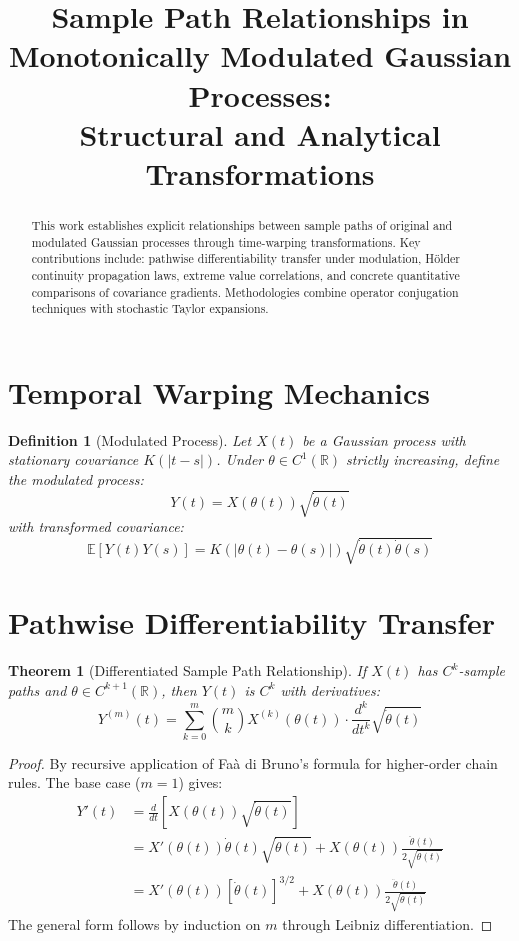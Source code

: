 \documentclass{article}
\title{Sample Path Relationships in Monotonically Modulated Gaussian Processes: \\ Structural and Analytical Transformations}
\author{}
\date{}
\newtheorem{theorem}{Theorem}
\newtheorem{definition}{Definition}
\begin{document}
\maketitle

\begin{abstract}
This work establishes explicit relationships between sample paths of original and modulated Gaussian processes through time-warping transformations. Key contributions include: pathwise differentiability transfer under modulation, Hölder continuity propagation laws, extreme value correlations, and concrete quantitative comparisons of covariance gradients. Methodologies combine operator conjugation techniques with stochastic Taylor expansions.
\end{abstract}

\section{Temporal Warping Mechanics} 

\begin{definition}[Modulated Process]
Let $X(t)$ be a Gaussian process with stationary covariance $K(|t-s|)$. Under $\theta \in C^1(\mathbb{R})$ strictly increasing, define the modulated process:
\begin{equation*}
Y(t) = X(\theta(t))\sqrt{\dot{\theta}(t)}
\end{equation*}
with transformed covariance:
\begin{equation*}
\mathbb{E}[Y(t)Y(s)] = K(|\theta(t)-\theta(s)|)\sqrt{\dot{\theta}(t)\dot{\theta}(s)}
\end{equation*}
\end{definition}

\section{Pathwise Differentiability Transfer}

\begin{theorem}[Differentiated Sample Path Relationship]
If $X(t)$ has $C^k$-sample paths and $\theta \in C^{k+1}(\mathbb{R})$, then $Y(t)$ is $C^k$ with derivatives:
\begin{equation*}
Y^{(m)}(t) = \sum_{k=0}^m \binom{m}{k} X^{(k)}(\theta(t)) \cdot \frac{d^k}{dt^k}\sqrt{\dot{\theta}(t)}
\end{equation*}
\end{theorem}

\begin{proof}
By recursive application of Faà di Bruno's formula for higher-order chain rules. The base case ($m=1$) gives:
\begin{align*}
Y'(t) &= \frac{d}{dt}\left[X(\theta(t))\sqrt{\dot{\theta}(t)}\right] \\
&= X'(\theta(t))\dot{\theta}(t)\sqrt{\dot{\theta}(t)} + X(\theta(t))\frac{\ddot{\theta}(t)}{2\sqrt{\dot{\theta}(t)}} \\
&= X'(\theta(t))[\dot{\theta}(t)]^{3/2} + X(\theta(t))\frac{\ddot{\theta}(t)}{2\sqrt{\dot{\theta}(t)}}
\end{align*}
The general form follows by induction on $m$ through Leibniz differentiation.
\end{proof}
\end{document}
